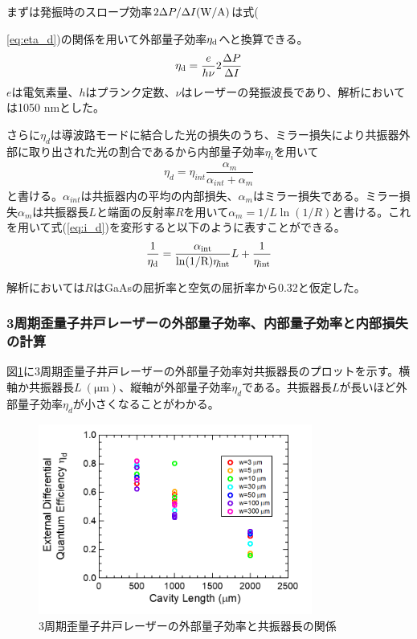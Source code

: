 まずは発振時のスロープ効率$2 \Delta P/\Delta I \rm{ (W/A)}$は式({\ref{eq:eta_d})の関係を用いて外部量子効率$\eta_{\rm{d}}$へと換算できる。
\begin{eqnarray}
\eta_{\rm{d}}=\dfrac{e}{h\nu}2\dfrac{\Delta P}{\Delta I} 
\label{eq:eta_d}
\end{eqnarray}
$e$は電気素量、$h$はプランク定数、$\nu$はレーザーの発振波長であり、解析においては1050 nmとした。


さらに$\eta_{d}$は導波路モードに結合した光の損失のうち、ミラー損失により共振器外部に取り出された光の割合であるから内部量子効率$\eta_{i}$を用いて
\begin{eqnarray}
\eta_{d}=\eta_{int}\dfrac{\alpha_{m}}{\alpha_{int} +\alpha_{m}}
\label{eq:i_d}
\end{eqnarray}
と書ける。$\alpha_{int}$は共振器内の平均の内部損失、$\alpha_{m}$はミラー損失である。ミラー損失$\alpha_{m}$は共振器長$L$と端面の反射率$R$を用いて$\alpha_{m}=1/L\ln (1/R)$と書ける。これを用いて式(\ref{eq:i_d})を変形すると以下のように表すことができる。
\begin{eqnarray}
\dfrac{1}{\eta_{\rm{d}}}=\dfrac{\alpha_{\rm{int}}}{\rm{ln}(1/R)\eta_{int}}L+\dfrac{1}{\eta_{\rm{int}}}
\label{eq:eta_inverse}
\end{eqnarray}



解析においては$R$はGaAsの屈折率と空気の屈折率から0.32と仮定した。

\subsubsection{3周期歪量子井戸レーザーの外部量子効率、内部量子効率と内部損失の計算}
図\ref{fig:fig_3_1_3QW_broadcontact_id_02}に3周期歪量子井戸レーザーの外部量子効率対共振器長のプロットを示す。横軸か共振器長$L\ (\si{\micro\metre})$、縦軸が外部量子効率$\eta_{d}$である。共振器長$L$が長いほど外部量子効率$\eta_{d}$が小さくなることがわかる。

\begin{figure}[h]
	\centering
	\includegraphics[width=9cm]{figure/fig_3_1_3QW_broadcontact_id_02.png}
	\caption{3周期歪量子井戸レーザーの外部量子効率と共振器長の関係}
	\label{fig:fig_3_1_3QW_broadcontact_id_02}
\end{figure}

}
